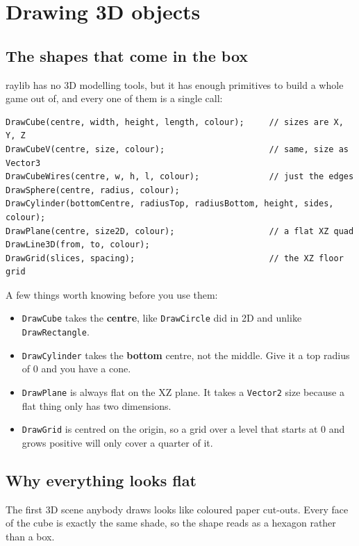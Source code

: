 \chapter{Drawing 3D objects}

\section{The shapes that come in the box}

raylib has no 3D modelling tools, but it has enough primitives to build a whole
game out of, and every one of them is a single call:

\begin{lstlisting}
DrawCube(centre, width, height, length, colour);     // sizes are X, Y, Z
DrawCubeV(centre, size, colour);                     // same, size as Vector3
DrawCubeWires(centre, w, h, l, colour);              // just the edges
DrawSphere(centre, radius, colour);
DrawCylinder(bottomCentre, radiusTop, radiusBottom, height, sides, colour);
DrawPlane(centre, size2D, colour);                   // a flat XZ quad
DrawLine3D(from, to, colour);
DrawGrid(slices, spacing);                           // the XZ floor grid
\end{lstlisting}

A few things worth knowing before you use them:

\begin{itemize}[leftmargin=*,itemsep=3pt]
  \item \lstinline|DrawCube| takes the \textbf{centre}, like
        \lstinline|DrawCircle| did in 2D and unlike \lstinline|DrawRectangle|.
  \item \lstinline|DrawCylinder| takes the \textbf{bottom} centre, not the middle.
        Give it a top radius of 0 and you have a cone.
  \item \lstinline|DrawPlane| is always flat on the XZ plane. It takes a
        \lstinline|Vector2| size because a flat thing only has two dimensions.
  \item \lstinline|DrawGrid| is centred on the origin, so a grid over a level
        that starts at 0 and grows positive will only cover a quarter of it.
\end{itemize}

\section{Why everything looks flat}

The first 3D scene anybody draws looks like coloured paper cut-outs. Every face
of the cube is exactly the same shade, so the shape reads as a hexagon rather
than a box.

